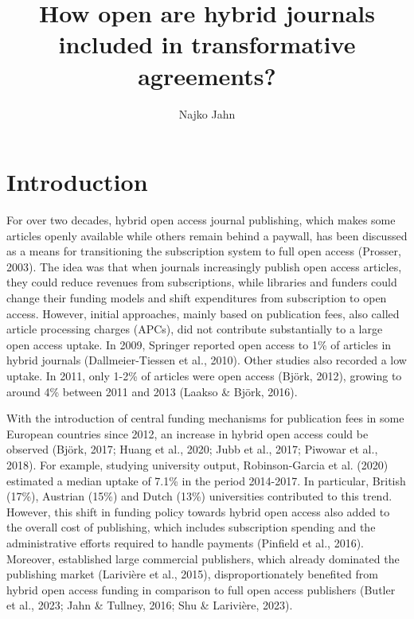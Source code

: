 \documentclass[a4paper,man,floatsintext,longtable,noextraspace,12pt]{apa6}
\title{\textbf{How open are hybrid journals included in transformative agreements?}}
\author{Najko Jahn}
\affiliation{Göttingen State and University Library, University of Göttingen\\
Platz der Göttinger Sieben 1, 37073 Göttingen, Germany\\
najko.jahn@sub.uni-goettingen.de
}
\begin{document}
\maketitle


\hypertarget{introduction}{%
\section{Introduction}\label{introduction}}

For over two decades, hybrid open access journal publishing, which makes
some articles openly available while others remain behind a paywall, has
been discussed as a means for transitioning the subscription system to
full open access (Prosser, 2003). The idea was that when journals
increasingly publish open access articles, they could reduce revenues
from subscriptions, while libraries and funders could change their
funding models and shift expenditures from subscription to open access.
However, initial approaches, mainly based on publication fees, also
called article processing charges (APCs), did not contribute
substantially to a large open access uptake. In 2009, Springer reported
open access to 1\% of articles in hybrid journals (Dallmeier-Tiessen et
al., 2010). Other studies also recorded a low uptake. In 2011, only
1-2\% of articles were open access (Björk, 2012), growing to around 4\%
between 2011 and 2013 (Laakso \& Björk, 2016).

With the introduction of central funding mechanisms for publication fees
in some European countries since 2012, an increase in hybrid open access
could be observed (Björk, 2017; Huang et al., 2020; Jubb et al., 2017;
Piwowar et al., 2018). For example, studying university output,
Robinson-Garcia et al. (2020) estimated a median uptake of 7.1\% in the
period 2014-2017. In particular, British (17\%), Austrian (15\%) and
Dutch (13\%) universities contributed to this trend. However, this shift
in funding policy towards hybrid open access also added to the overall
cost of publishing, which includes subscription spending and the
administrative efforts required to handle payments (Pinfield et al.,
2016). Moreover, established large commercial publishers, which already
dominated the publishing market (Larivière et al., 2015),
disproportionately benefited from hybrid open access funding in
comparison to full open access publishers (Butler et al., 2023; Jahn \&
Tullney, 2016; Shu \& Larivière, 2023).
\end{document}
